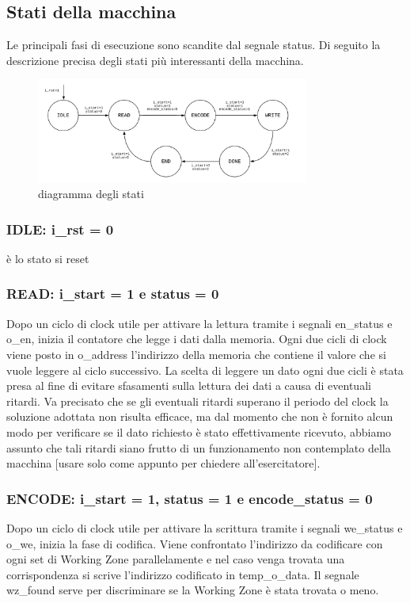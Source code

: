 \documentclass{article}
\begin{document}
\subsection{Stati della macchina}
Le principali fasi di esecuzione sono scandite dal segnale {\selectfont status}. Di seguito la descrizione precisa degli stati più interessanti della macchina.
\begin{figure}[h]
    \centering
    \includegraphics[width=0.8\textwidth]{fsa}
    \caption{diagramma degli stati}
\end{figure}
\subsubsection{IDLE: {\selectfont i\_rst} = 0}
è lo stato si reset
\subsubsection{READ: {\selectfont i\_start} = 1 e {\selectfont status} = 0}
Dopo un ciclo di clock utile per attivare la lettura tramite i segnali {\selectfont en\_status} e {\selectfont o\_en}, inizia il contatore che legge i dati dalla memoria. Ogni due cicli di clock viene posto in {\selectfont o\_address} l'indirizzo della memoria che contiene il valore che si vuole leggere al ciclo successivo. La scelta di leggere un dato ogni due cicli è stata presa al fine di evitare sfasamenti sulla lettura dei dati a causa di eventuali ritardi. Va precisato che se gli eventuali ritardi superano il periodo del clock la soluzione adottata non risulta efficace, ma dal momento che non è fornito alcun modo per verificare se il dato richiesto è stato effettivamente ricevuto, abbiamo assunto che tali ritardi siano frutto di un funzionamento non contemplato della macchina [usare solo come appunto per chiedere all'esercitatore].
\subsubsection{ENCODE: {\selectfont i\_start} = 1, {\selectfont status} = 1 e {\selectfont encode\_status} = 0}
Dopo un ciclo di clock utile per attivare la scrittura tramite i segnali {\selectfont we\_status} e {\selectfont o\_we}, inizia la fase di codifica. Viene confrontato l'indirizzo da codificare con ogni set di Working Zone parallelamente e nel caso venga trovata una corrispondenza si scrive l'indirizzo codificato in {\selectfont temp\_o\_data}. Il segnale {\selectfont wz\_found} serve per discriminare se la Working Zone è stata trovata o meno.
\end{document}
